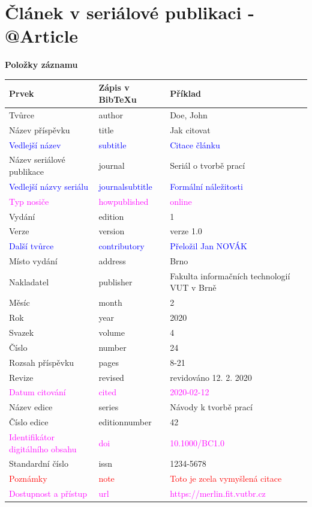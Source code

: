 \section*{Článek v seriálové publikaci - @Article}
\label{pr-casopis-clanek}
\noindent \textbf{Položky záznamu}

\medskip

\begin{tabularx}{\linewidth}{X X X}
    Prvek & Zápis v BibTeXu & Příklad \\\hline
    Tvůrce & author & Doe, John\\
    Název příspěvku & title & Jak citovat\\
    \textcolor{blue}{Vedlejší název} & \textcolor{blue}{subtitle} & \textcolor{blue}{Citace článku}\\
    Název seriálové publikace & journal & Seriál o tvorbě prací\\
    \textcolor{blue}{Vedlejší názvy seriálu} & \textcolor{blue}{journalsubtitle} & \textcolor{blue}{Formální náležitosti}\\
    \textcolor{magenta}{Typ nosiče} & \textcolor{magenta}{howpublished} & \textcolor{magenta}{online}\\
    Vydání & edition & 1\\
    Verze & version & verze 1.0\\
    \textcolor{blue}{Další tvůrce} & \textcolor{blue}{contributory} & \textcolor{blue}{Přeložil Jan NOVÁK}\\
    Místo vydání & address & Brno\\
    Nakladatel & publisher & Fakulta informačních technologií VUT v Brně\\
    Měsíc & month & 2\\
    Rok & year & 2020\\
    Svazek & volume & 4\\
    Číslo & number & 24\\
    Rozsah příspěvku & pages & 8-21\\
    Revize & revised & revidováno 12. 2. 2020\\
    \textcolor{magenta}{Datum citování} & \textcolor{magenta}{cited} & \textcolor{magenta}{2020-02-12}\\
    Název edice & series & Návody k tvorbě prací\\
    Číslo edice & editionnumber & 42\\
    \textcolor{magenta}{Identifikátor digitálního obsahu} & \textcolor{magenta}{doi} & \textcolor{magenta}{10.1000/BC1.0}\\
    Standardní číslo  & issn & 1234-5678\\
    \textcolor{red}{Poznámky} & \textcolor{red}{note} & \textcolor{red}{Toto je zcela vymyšlená citace}\\
    \textcolor{magenta}{Dostupnost a přístup} & \textcolor{magenta}{url} & \textcolor{magenta}{https://merlin.fit.vutbr.cz}
\end{tabularx}

